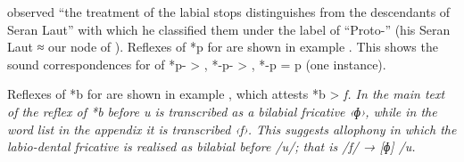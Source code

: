 \citet[133]{Collins1986} observed “the treatment of the labial
stops distinguishes  from the descendants of Seran Laut”
with which he classified them under the label of “Proto-”
(his Seran Laut ≈ our  node of ).
Reflexes of *p for  are shown in example .
This shows the sound correspondences for  of *p- > {\0},
*-p- > {\0}, *-p = p (one instance).


Reflexes of *b for  are shown in example ,
which attests *b > \it{f}.
In the main text of \citet[131--134]{Collins1986} the reflex
of *b before \it{u} is transcribed as a bilabial fricative ‹ɸ›,
while in the word list in the appendix it is transcribed ‹f›.
This suggests allophony in which the labio-dental fricative is
realised as bilabial before /u/; that is /f/ → [ɸ] /{\gap}u.

